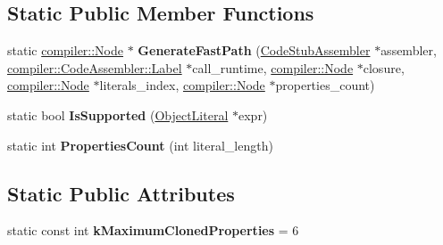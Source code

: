\subsection*{Static Public Member Functions}
\begin{DoxyCompactItemize}
\item 
static \hyperlink{classv8_1_1internal_1_1compiler_1_1_node}{compiler\+::\+Node} $\ast$ {\bfseries Generate\+Fast\+Path} (\hyperlink{classv8_1_1internal_1_1_code_stub_assembler}{Code\+Stub\+Assembler} $\ast$assembler, \hyperlink{classv8_1_1internal_1_1compiler_1_1_code_assembler_1_1_label}{compiler\+::\+Code\+Assembler\+::\+Label} $\ast$call\+\_\+runtime, \hyperlink{classv8_1_1internal_1_1compiler_1_1_node}{compiler\+::\+Node} $\ast$closure, \hyperlink{classv8_1_1internal_1_1compiler_1_1_node}{compiler\+::\+Node} $\ast$literals\+\_\+index, \hyperlink{classv8_1_1internal_1_1compiler_1_1_node}{compiler\+::\+Node} $\ast$properties\+\_\+count)\hypertarget{classv8_1_1internal_1_1_fast_clone_shallow_object_stub_aa905b0c6fdbb68056a96b17d0226e774}{}\label{classv8_1_1internal_1_1_fast_clone_shallow_object_stub_aa905b0c6fdbb68056a96b17d0226e774}

\item 
static bool {\bfseries Is\+Supported} (\hyperlink{classv8_1_1internal_1_1_object_literal}{Object\+Literal} $\ast$expr)\hypertarget{classv8_1_1internal_1_1_fast_clone_shallow_object_stub_a6384598585578d50f544e2fd8d9602c5}{}\label{classv8_1_1internal_1_1_fast_clone_shallow_object_stub_a6384598585578d50f544e2fd8d9602c5}

\item 
static int {\bfseries Properties\+Count} (int literal\+\_\+length)\hypertarget{classv8_1_1internal_1_1_fast_clone_shallow_object_stub_a4a830cb896a0b1c323619d7649b51936}{}\label{classv8_1_1internal_1_1_fast_clone_shallow_object_stub_a4a830cb896a0b1c323619d7649b51936}

\end{DoxyCompactItemize}
\subsection*{Static Public Attributes}
\begin{DoxyCompactItemize}
\item 
static const int {\bfseries k\+Maximum\+Cloned\+Properties} = 6\hypertarget{classv8_1_1internal_1_1_fast_clone_shallow_object_stub_aef6426a2b2b460eac45ba180dbef7f9b}{}\label{classv8_1_1internal_1_1_fast_clone_shallow_object_stub_aef6426a2b2b460eac45ba180dbef7f9b}

\end{DoxyCompactItemize}
